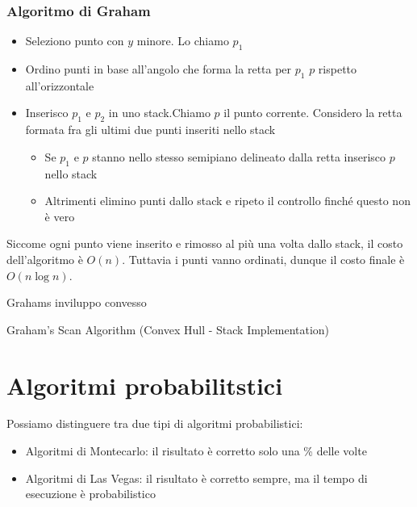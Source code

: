 \subsubsection{Algoritmo di Graham}
\begin{itemize}
	\item Seleziono punto con $ y $ minore. Lo chiamo $ p_1 $
	\item Ordino punti in base all'angolo che forma la retta per $ p_1 $ $ p $ rispetto all'orizzontale
	\item Inserisco $ p_1 $  e $ p_2 $ in uno stack.Chiamo $ p $ il punto corrente. Considero la retta formata fra gli ultimi due punti inseriti nello stack
	      \begin{itemize}
		      \item  Se $ p_1 $ e $ p $ stanno nello stesso semipiano delineato dalla retta inserisco $ p $ nello stack
		      \item Altrimenti elimino punti dallo stack e ripeto il controllo finché questo non è vero
	      \end{itemize}
\end{itemize}
Siccome ogni punto viene inserito e rimosso al più una volta dallo stack, il costo dell'algoritmo è $ O\left(n\right) $. Tuttavia i punti vanno ordinati, dunque il costo finale è $ O\left(n \log n\right) $.
\vskip3mm
\begin{algoritmo}{Grahams inviluppo convesso}
	\begin{algorithm}[H]
		\caption{Graham's Scan Algorithm (Convex Hull - Stack Implementation)}

	\end{algorithm}
\end{algoritmo}
\section{Algoritmi probabilitstici}
Possiamo distinguere tra due tipi di algoritmi probabilistici:
\begin{itemize}
	\item Algoritmi di Montecarlo: il risultato è corretto solo una  \%  delle volte
	\item Algoritmi di Las Vegas: il risultato è corretto sempre, ma il tempo di esecuzione è probabilistico
\end{itemize}
